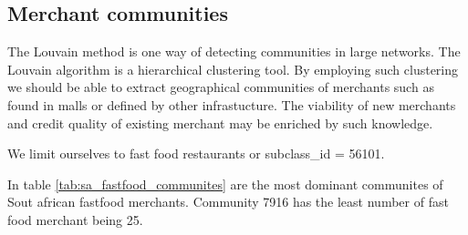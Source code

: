 \subsection{Merchant communities}

The Louvain method is one way of detecting communities in large networks.  The Louvain algorithm is a hierarchical clustering tool.  By employing such clustering we should be able to extract geographical communities of merchants such as found in malls or defined by other infrastucture. The viability of new merchants and credit quality of existing merchant may be enriched by such knowledge.

We limit ourselves to fast food restaurants or subclass\_id = 56101.

In table \ref{tab:sa_fastfood_communites} are the most dominant communites of Sout african fastfood merchants.  Community 7916 has the least number of fast food merchant being 25. 

